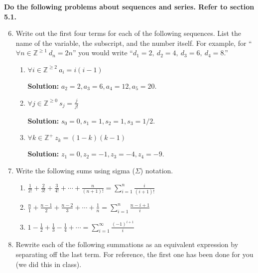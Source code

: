 \documentclass[12pt, letterpaper]{report}
\newcommand{\Z}{\mathbb{Z}}
\begin{document}
\bigskip
\textbf{Do the following problems about sequences and series.  Refer to section 5.1.}

\begin{enumerate}\setcounter{enumi}{5}
        
\item Write out the first four terms for each of the following sequences.  List the name
of the variable, the subscript, and the number itself.  For example, for ``$\forall n 
\in \Z^{\geq 1} \ d_n = 2n$'' you would write ``$d_1 = 2, \ d_2 = 4, \ d_3 = 6, \ d_4 = 8$.''

\begin{enumerate}
        \item $\forall i \in \Z^{\geq 2} \ a_i = i(i-1)$
        
        \textbf{Solution:} $a_2 = 2, a_3 = 6, a_4 = 12, a_5=20$.
        
        \item $\displaystyle \forall j \in \Z^{\geq 0} \ s_j = \frac{j}{j!}$
        
         \textbf{Solution:} $s_0 = 0, s_1 = 1, s_2 = 1, s_3 = 1/2$.
        
        \item $\displaystyle \forall k \in \Z^+ \ z_k = (1-k)(k-1)$
        
         \textbf{Solution:} $z_1 = 0, z_2 = -1, z_3 = -4, z_4 = -9$.
        
\end{enumerate}


\item Write the following sums using sigma ($\Sigma$) notation.

\begin{enumerate}

         \item $\displaystyle \frac{1}{2!} + \frac{2}{3!} + \frac{3}{4!} + \cdots + \frac{n}{(n+1)!}
        =\displaystyle \sum_{i=1}^n \frac{i}{(i+1)!}$
        \item $\displaystyle \frac{n}{1} + \frac{n-1}{2} + \frac{n-2}{3} + \cdots + \frac{1}{n}
        =\displaystyle \sum_{i=1}^n \frac{n-i+1}{i}$    
        \item $\displaystyle 1 - \frac{1}{2} + \frac{1}{3} - \frac{1}{4} + \cdots
        =\displaystyle \sum_{i=1}^\infty \frac{(-1)^{i+1}}{i}$\end{enumerate}

\item Rewrite each of the following summations as an equivalent expression by separating off the last term.
For reference, the first one has been done for you (we did this in class).


\end{enumerate}
\end{document}
